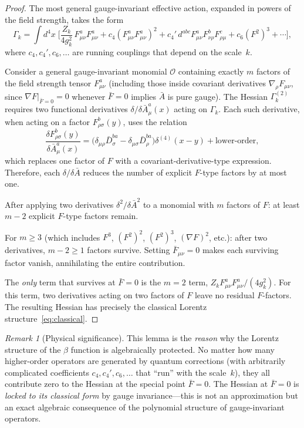 \documentclass[12pt,a4paper]{article}
\theoremstyle{plain}
\theoremstyle{definition}
\theoremstyle{remark}
\newtheorem{remark}[theorem]{Remark}
\begin{document}
\begin{proof}
The most general gauge-invariant effective action, expanded in powers of the field strength, takes the form
\begin{equation}\label{eq:Gammaexpand}
\Gamma_k = \int d^4x\;\bigg[\frac{Z_k}{4g_k^2}\,F_{\mu\nu}^a F_{\mu\nu}^a + c_4(F_{\mu\nu}^a F_{\mu\nu}^a)^2 + c_4'\,d^{abc}F_{\mu\nu}^a F_{\nu\rho}^b F_{\rho\mu}^c + c_6(F^2)^3 + \cdots\bigg],
\end{equation}
where $c_4,c_4',c_6,\ldots$ are running couplings that depend on the scale~$k$.

Consider a general gauge-invariant monomial $\mathcal{O}$ containing exactly $m$ factors of the field strength tensor $F_{\mu\nu}^a$ (including those inside covariant derivatives $\nabla_\rho F_{\mu\nu}$, since $\nabla F|_{\bar{F}=0}=0$ whenever $\bar{F}=0$ implies $\bar{A}$ is pure gauge). The Hessian $\Gamma_k^{(2)}$ requires two functional derivatives $\delta/\delta\bar{A}_\mu^a(x)$ acting on $\Gamma_k$. Each such derivative, when acting on a factor $F_{\rho\sigma}^b(y)$, uses the relation
\begin{equation}\label{eq:dFdA}
\frac{\delta F_{\rho\sigma}^b(y)}{\delta \bar{A}_\mu^a(x)} = \Big(\delta_{\mu\rho}\bar{D}_\sigma^{ba} - \delta_{\mu\sigma}\bar{D}_\rho^{ba}\Big)\delta^{(4)}(x-y) + \text{lower-order},
\end{equation}
which replaces one factor of $F$ with a covariant-derivative-type expression. Therefore, each $\delta/\delta\bar{A}$ reduces the number of explicit $F$-type factors by at most one.

After applying two derivatives $\delta^2/\delta\bar{A}^2$ to a monomial with $m$ factors of $F$: at least $m-2$ explicit $F$-type factors remain.

For $m\geq 3$ (which includes $F^3$, $(F^2)^2$, $(F^2)^3$, $(\nabla F)^2$, etc.): after two derivatives, $m-2\geq 1$ factors survive. Setting $\bar{F}_{\mu\nu}=0$ makes each surviving factor vanish, annihilating the entire contribution.

The \emph{only} term that survives at $\bar{F}=0$ is the $m=2$ term, $Z_k F_{\mu\nu}^a F_{\mu\nu}^a/(4g_k^2)$. For this term, two derivatives acting on two factors of $F$ leave no residual $F$-factors. The resulting Hessian has precisely the classical Lorentz structure~\eqref{eq:classical}.
\end{proof}

\begin{remark}[Physical significance]\label{rem:locking}
This lemma is the \emph{reason} why the Lorentz structure of the $\beta$ function is algebraically protected. No matter how many higher-order operators are generated by quantum corrections (with arbitrarily complicated coefficients $c_4,c_4',c_6,\ldots$ that ``run'' with the scale~$k$), they all contribute zero to the Hessian at the special point $\bar{F}=0$. The Hessian at $\bar{F}=0$ is \emph{locked to its classical form} by gauge invariance---this is not an approximation but an exact algebraic consequence of the polynomial structure of gauge-invariant operators.
\end{remark}
\end{document}
